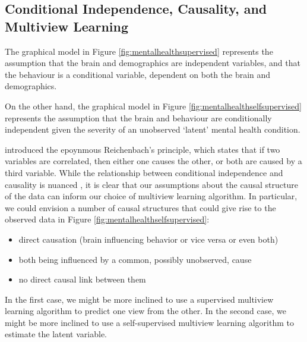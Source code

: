 \subsection{Conditional Independence, Causality, and Multiview Learning}

The graphical model in Figure \ref{fig:mentalhealthsupervised} represents the assumption that the brain and demographics are independent variables, and that the behaviour is a conditional variable, dependent on both the brain and demographics.

On the other hand, the graphical model in Figure \ref{fig:mentalhealthselfsupervised} represents the assumption that the brain and behaviour are conditionally independent given the severity of an unobserved `latent' mental health condition.

\citet{reichenbach1956direction} introduced the epoynmous Reichenbach's principle, which states that if two variables are correlated, then either one causes the other, or both are caused by a third variable.
While the relationship between conditional independence and causality is nuanced \citep{pearl2009causality}, it is clear that our assumptions about the causal structure of the data can inform our choice of multiview learning algorithm.
In particular, we could envision a number of causal structures that could give rise to the observed data in Figure \ref{fig:mentalhealthselfsupervised}:

\begin{itemize}
    \item direct causation (brain influencing behavior or vice versa or even both)
    \item both being influenced by a common, possibly unobserved, cause
    \item no direct causal link between them
\end{itemize}

In the first case, we might be more inclined to use a supervised multiview learning algorithm to predict one view from the other.
In the second case, we might be more inclined to use a self-supervised multiview learning algorithm to estimate the latent variable.

